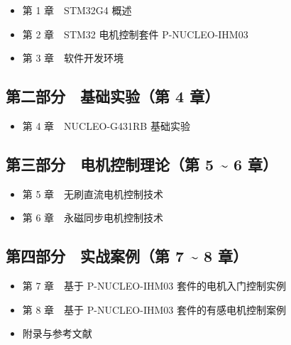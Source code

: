 \documentclass[
  UTF8,
  scheme=plain,
  fontsize=10pt,
  openany
]{ctexbook}
\begin{document}
\begin{itemize}
\tightlist
\item
  第 1 章　STM32G4 概述
\item
  第 2 章　STM32 电机控制套件 P-NUCLEO-IHM03
\item
  第 3 章　软件开发环境
\end{itemize}

\subsection*{第二部分　基础实验（第 4
章）}\label{ux7b2cux4e8cux90e8ux5206-ux57faux7840ux5b9eux9a8cux7b2c-4-ux7ae0}

\begin{itemize}
\tightlist
\item
  第 4 章　NUCLEO-G431RB 基础实验
\end{itemize}

\subsection*{\texorpdfstring{第三部分　电机控制理论（第 5
\textasciitilde{} 6
章）}{第三部分　电机控制理论（第 5  6 章）}}\label{ux7b2cux4e09ux90e8ux5206-ux7535ux673aux63a7ux5236ux7406ux8bbaux7b2c-5-6-ux7ae0}

\begin{itemize}
\tightlist
\item
  第 5 章　无刷直流电机控制技术
\item
  第 6 章　永磁同步电机控制技术
\end{itemize}

\subsection*{\texorpdfstring{第四部分　实战案例（第 7 \textasciitilde{}
8
章）}{第四部分　实战案例（第 7  8 章）}}\label{ux7b2cux56dbux90e8ux5206-ux5b9eux6218ux6848ux4f8bux7b2c-7-8-ux7ae0}

\begin{itemize}
\tightlist
\item
  第 7 章　基于 P-NUCLEO-IHM03 套件的电机入门控制实例
\item
  第 8 章　基于 P-NUCLEO-IHM03 套件的有感电机控制案例
\item
  附录与参考文献
\end{itemize}
\end{document}
